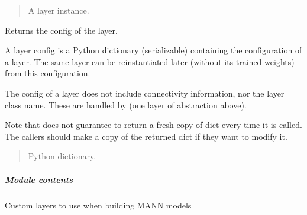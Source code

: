\documentclass[letterpaper,10pt,english]{sphinxmanual}
\begin{document}
\begin{fulllineitems}
\begin{fulllineitems}
\begin{quote}
\begin{description}
\sphinxAtStartPar
A layer instance.

\end{description}\end{quote}

\end{fulllineitems}


\begin{fulllineitems}
\label{\detokenize{beyondml.tflow.layers:beyondml.tflow.layers.SumLayer.SumLayer.get_config}}
\pysigstartsignatures
{}
\pysigstopsignatures
\sphinxAtStartPar
Returns the config of the layer.

\sphinxAtStartPar
A layer config is a Python dictionary (serializable)
containing the configuration of a layer.
The same layer can be reinstantiated later
(without its trained weights) from this configuration.

\sphinxAtStartPar
The config of a layer does not include connectivity
information, nor the layer class name. These are handled
by  (one layer of abstraction above).

\sphinxAtStartPar
Note that  does not guarantee to return a fresh copy of
dict every time it is called. The callers should make a copy of the
returned dict if they want to modify it.
\begin{quote}\begin{description}
\sphinxAtStartPar
Python dictionary.

\end{description}\end{quote}

\end{fulllineitems}


\end{fulllineitems}



\subparagraph{Module contents}
\label{\detokenize{beyondml.tflow.layers:module-beyondml.tflow.layers}}\label{\detokenize{beyondml.tflow.layers:module-contents}}
\sphinxAtStartPar
Custom layers to use when building MANN models
\end{document}
